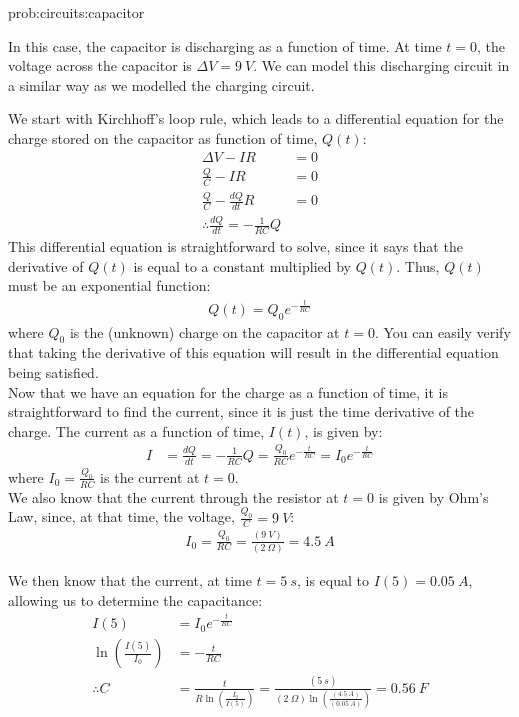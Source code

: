 \begin{solutionParts}{prob:circuits:capacitor}
{\label{soln:circuits:capacitor}
\item In this case, the capacitor is discharging as a function of time. At time $t=0$, the voltage across the capacitor is $\Delta V=\SI{9}{V}$. We can model this discharging circuit in a similar way as we modelled the charging circuit. 

We start with Kirchhoff's loop rule, which leads to a differential equation for the charge stored on the capacitor as function of time, $Q(t)$:
\begin{align*}
\Delta V - IR &=0\\
\frac{Q}{C} - IR &=0\\
\frac{Q}{C} - \frac{dQ}{dt}R &=0\\
\therefore \frac{dQ}{dt} = -\frac{1}{RC}Q
\end{align*}
This differential equation is straightforward to solve, since it says that the derivative of $Q(t)$ is equal to a constant multiplied by $Q(t)$. Thus, $Q(t)$ must be an exponential function:
\begin{align*}
Q(t) = Q_0 e^{-\frac{t}{RC}}
\end{align*}
where $Q_0$ is the (unknown) charge on the capacitor at $t=0$. You can easily verify that taking the derivative of this equation will result in the differential equation being satisfied. \\

Now that we have an equation for the charge as a function of time, it is straightforward to find the current, since it is just the time derivative of the charge. The current as a function of time, $I(t)$, is given by:
\begin{align*}
I &=\frac{dQ}{dt}=-\frac{1}{RC}Q=\frac{Q_0}{RC} e^{-\frac{t}{RC}}=I_0e^{-\frac{t}{RC}}
\end{align*}
where $I_0=\frac{Q_0}{RC}$ is the current at $t=0$.\\

We also know that the current through the resistor at $t=0$ is given by Ohm's Law, since, at that time, the voltage, $\frac{Q_0}{C}=\SI{9}{V}$:
\begin{align*}
I_0=\frac{Q_0}{RC}=\frac{(\SI{9}{V})}{(\SI{2}{\Omega})}=\SI{4.5}{A}
\end{align*}

We then know that the current, at time $t=\SI{5}{s}$, is equal to $I(5)=\SI{0.05}{A}$, allowing us to determine the capacitance:
\begin{align*}
I(5)&=I_0e^{-\frac{t}{RC}}\\
\ln\left( \frac{I(5)}{I_0} \right)&=-\frac{t}{RC}\\
\therefore C&=\frac{t}{R \ln\left( \frac{I_0}{I(5)} \right)}=\frac{(\SI{5}{s})}{(\SI{2}{\Omega})\ln\left( \frac{(\SI{4.5}{A})}{(\SI{0.05}{A})} \right)}=\SI{0.56}{F}
\end{align*}

}
\end{solutionParts}
